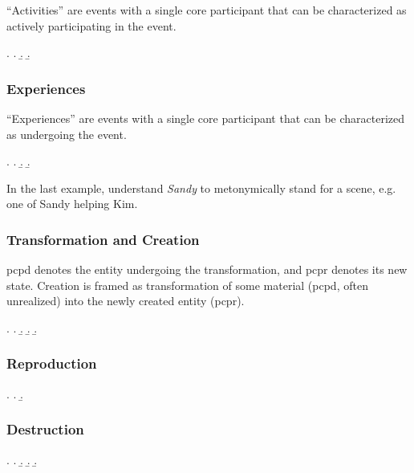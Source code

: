 \documentclass[a4paper]{article}
\begin{document}
``Activities'' are events with a single core participant that can be
characterized as actively participating in the event.

\ex. \a. 
     \b. 
     \b. 

\subsubsection{Experiences}

``Experiences'' are events with a single core participant that can be
characterized as undergoing the event.

\ex. \a. 
     \b. 
     \b. 

In the last example, understand \emph{Sandy} to metonymically stand for a scene,
e.g. one of Sandy helping Kim.

\subsubsection{Transformation and Creation}

\textsf{pcpd} denotes the entity undergoing the transformation, and
\textsf{pcpr} denotes its new state. Creation is framed as transformation of
some material (\textsf{pcpd}, often unrealized) into the newly created entity
(\textsf{pcpr}).

\ex. \a. 
     \b. 
     \b. 
     \b. 

\subsubsection{Reproduction}

\ex. \a. 
     \b. 

\subsubsection{Destruction}

\ex. \a. 
     \b. 
     \b. 
     \b. 
\end{document}
